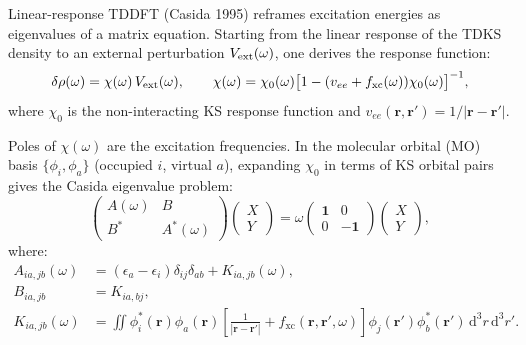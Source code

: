 \documentclass[12pt,letterpaper]{article}
\newcommand{\dd}{\mathrm{d}}
\newcommand{\fxc}{f_{\mathrm{xc}}}
\theoremstyle{definition}
\begin{document}
Linear-response TDDFT (Casida 1995) reframes excitation energies as
eigenvalues of a matrix equation.  Starting from the linear response
of the TDKS density to an external perturbation $V_{\rm ext}(\omega)$,
one derives the response function:
\begin{equation}
  \delta\rho(\omega) = \chi(\omega)\,V_{\rm ext}(\omega),
  \qquad
  \chi(\omega) = \chi_0(\omega)\bigl[1 - (v_{ee}+\fxc(\omega))\chi_0(\omega)\bigr]^{-1},
  \label{eq:chi}
\end{equation}
where $\chi_0$ is the non-interacting KS response function and
$v_{ee}(\bm{r},\bm{r}') = 1/|\bm{r}-\bm{r}'|$.

Poles of $\chi(\omega)$ are the excitation frequencies.  In the
molecular orbital (MO) basis $\{\phi_i, \phi_a\}$ (occupied $i$,
virtual $a$), expanding $\chi_0$ in terms of KS orbital pairs gives
the Casida eigenvalue problem:
\begin{equation}
  \begin{pmatrix} A(\omega) & B \\ B^* & A^*(\omega) \end{pmatrix}
  \begin{pmatrix} X \\ Y \end{pmatrix}
  = \omega\begin{pmatrix} \mathbf{1} & 0 \\ 0 & -\mathbf{1} \end{pmatrix}
  \begin{pmatrix} X \\ Y \end{pmatrix},
  \label{eq:casida}
\end{equation}
where:
\begin{align}
  A_{ia,jb}(\omega) &= (\epsilon_a-\epsilon_i)\delta_{ij}\delta_{ab}
    + K_{ia,jb}(\omega),\label{eq:Amat}\\
  B_{ia,jb} &= K_{ia,bj},\\
  K_{ia,jb}(\omega) &= \iint\phi_i^*(\bm{r})\phi_a(\bm{r})
    \left[\frac{1}{|\bm{r}-\bm{r}'|}+\fxc(\bm{r},\bm{r}',\omega)\right]
    \phi_j(\bm{r}')\phi_b^*(\bm{r}')\,\dd^3r\,\dd^3r'.
\end{align}
\end{document}
